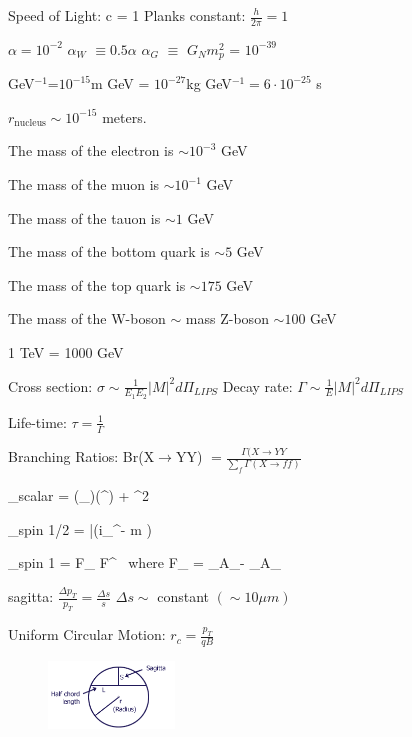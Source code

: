 {\large

Speed of Light: c = 1  \hspace{1in} Planks constant: $\frac{h}{2\pi} = 1$

$\alpha = 10^{-2}$  \hspace{1in} $\alpha_W$ $\equiv 0.5 \alpha$ \hspace{1in} $\alpha_G$ $\equiv$ $G_N m_p^2$ = $10^{-39}$

GeV$^{-1}$=$10^{-15}$m  \hspace{1in} GeV = $10^{-27}$kg \hspace{1in}   GeV$^{-1} = 6 \cdot 10^{-25}$ s

$r_\textrm{nucleus} \sim 10^{-15}$ meters.

The mass of the electron is $\sim 10^{-3}$ GeV

The mass of the muon is $\sim 10^{-1}$ GeV

The mass of the tauon is $\sim 1$ GeV

The mass of the bottom quark is $\sim 5$ GeV

The mass of the top quark is $\sim 175$ GeV

The mass of the W-boson $\sim$ mass Z-boson $\sim 100$ GeV

1 TeV = 1000 GeV

Cross section: $\sigma \sim \frac{1}{E_1 E_2}|M|^2 d\Pi_{LIPS}$  \hspace{1in} Decay rate: $\Gamma \sim \frac{1}{E} |M|^2 d\Pi_{LIPS}$

Life-time: $\tau = \frac{1}{\Gamma}$  

Branching Ratios:  Br(X$\rightarrow$YY) $= \frac{\Gamma(X\rightarrow YY}{\sum_f \Gamma(X\rightarrow ff)}$

\be
{}_{scalar} =  (\partial_\mu \phi)(\partial^\mu \phi) +  \phi^2
\ee

\be
{}_{spin 1/2} = \bar{\psi}(i\gamma_\mu \partial^\mu - m )\psi
\ee

\be
{}_{spin 1} = F_{\mu\nu} F^{\mu\nu}\ \textrm{ where } F_{\mu\nu} = \partial_\mu A_\nu - \partial_\mu A_\nu
\ee

sagitta:  $\frac{\Delta p_T}{p_T} = \frac{\Delta s}{s}$  \hspace{1in} $\Delta s \sim $ constant $ (\sim 10 \mu m)$ 

Uniform Circular Motion: $r_c = \frac{p_T}{qB}$ 

\begin{figure}[h!]
\centering
\includegraphics[width=0.3\textwidth]{./Sagitta.png}
\end{figure}

}






